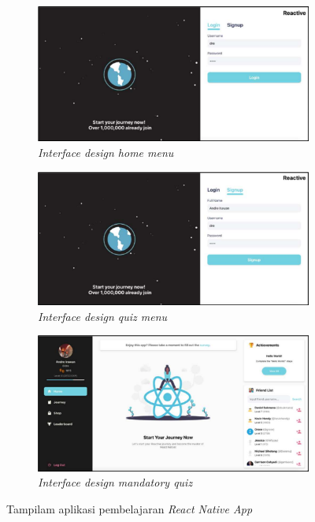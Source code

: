 \begin{figure}[htbp]
	\centering
	\begin{subfigure}[b]{0.4\textwidth}
		\centering
	  \includegraphics[width=\linewidth]{contents/chapter-2/images/Andre-a1.png}
	  \caption{\textit{Interface design home menu}}
	  \label{fig:sub-andre-a1}
	\end{subfigure}
	\begin{subfigure}[b]{0.4\textwidth}
	\centering
	  \includegraphics[width=\linewidth]{contents/chapter-2/images/Andre-a2.png}
	  \caption{\textit{Interface design quiz menu }}
	  \label{fig:sub-andre-a2}
	\end{subfigure}
	\hfill
	\begin{subfigure}[b]{0.4\textwidth}
		\centering
		\includegraphics[width=\linewidth]{contents/chapter-2/images/Andre-a3.png}
		\caption{\textit{Interface design mandatory quiz}}
		\label{fig:sub-andre-a3}
	\end{subfigure}  
	\caption{Tampilam aplikasi pembelajaran \textit{React Native App}}
	\label{fig:interface pembelajaran React Native}
  \end{figure}



